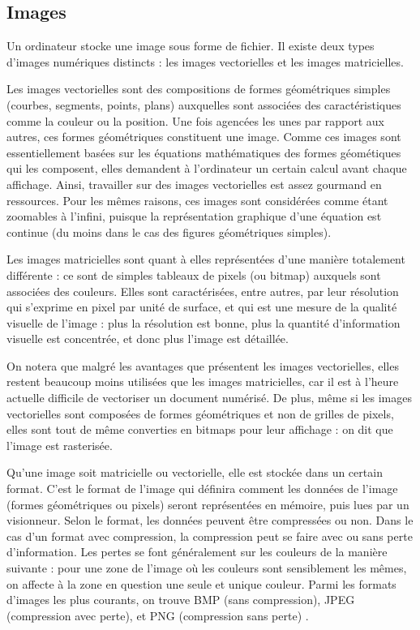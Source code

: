 \subsection{Images}

Un ordinateur stocke une image sous forme de fichier.
Il existe deux types d'images numériques distincts : les images vectorielles
et les images matricielles. 

Les images vectorielles sont des compositions de formes géométriques
simples (courbes, segments, points, plans) auxquelles sont associées
des caractéristiques comme la couleur ou la position. Une fois agencées
les unes par rapport aux autres, ces formes géométriques constituent
une image. Comme ces images sont essentiellement basées sur les équations
mathématiques des formes géométiques qui les composent, elles demandent
à l'ordinateur un certain calcul avant chaque affichage. Ainsi, travailler
sur des images vectorielles est assez gourmand en ressources. Pour
les mêmes raisons, ces images sont considérées comme étant zoomables
à l'infini, puisque la représentation graphique d'une équation est
continue (du moins dans le cas des figures géométriques simples).

Les images matricielles sont quant à elles représentées d'une manière
totalement différente : ce sont de simples tableaux de pixels (ou
bitmap) auxquels sont associées des couleurs. Elles sont caractérisées,
entre autres, par leur résolution qui s'exprime en pixel par unité
de surface, et qui est une mesure de la qualité visuelle de l'image
: plus la résolution est bonne, plus la quantité d'information visuelle
est concentrée, et donc plus l'image est détaillée.

On notera que malgré les avantages que présentent les images vectorielles,
elles restent beaucoup moins utilisées que les images matricielles,
car il est à l'heure actuelle difficile de vectoriser un document
numérisé. De plus, même si les images vectorielles sont composées
de formes géométriques et non de grilles de pixels, elles sont tout
de même converties en bitmaps pour leur affichage : on dit que l'image
est rasterisée.

Qu'une image soit matricielle ou vectorielle, elle est stockée dans
un certain format. C'est le format de l'image qui définira comment
les données de l'image (formes géométriques ou pixels) seront représentées
en mémoire, puis lues par un visionneur. Selon le format, les données peuvent être compressées ou non. Dans le cas d'un format avec compression, la compression peut se faire avec ou sans perte d'information. Les pertes se font généralement sur les couleurs de la manière suivante : pour une zone de l'image où les couleurs sont sensiblement les mêmes, on affecte à la zone en question une seule et unique couleur. Parmi les formats d'images les plus courants, on trouve BMP (sans compression), JPEG (compression avec perte), et PNG (compression sans perte) \cite{Jab96}. 

